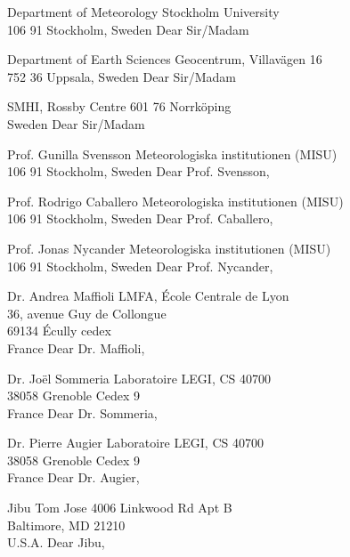 %

Department of Meteorology
Stockholm University\\106 91 Stockholm, Sweden
Dear Sir/Madam

Department of Earth Sciences
Geocentrum, Villavägen 16\\752 36 Uppsala, Sweden
Dear Sir/Madam

SMHI, Rossby Centre
601 76 Norrköping\\Sweden
Dear Sir/Madam

Prof. Gunilla Svensson
Meteorologiska institutionen (MISU)\\106 91 Stockholm, Sweden
Dear Prof. Svensson,

Prof. Rodrigo Caballero
Meteorologiska institutionen (MISU)\\106 91 Stockholm, Sweden
Dear Prof. Caballero,

Prof. Jonas Nycander
Meteorologiska institutionen (MISU)\\106 91 Stockholm, Sweden
Dear Prof. Nycander,

%

Dr. Andrea Maffioli
LMFA, École Centrale de Lyon\\36, avenue Guy de Collongue\\69134 Écully cedex\\France
Dear Dr. Maffioli,

Dr. Jo\"el Sommeria
Laboratoire LEGI, CS 40700\\38058 Grenoble Cedex 9\\France
Dear Dr. Sommeria,

Dr. Pierre Augier
Laboratoire LEGI, CS 40700\\38058 Grenoble Cedex 9\\France
Dear Dr. Augier,

%

Jibu Tom Jose
4006 Linkwood Rd Apt B\\Baltimore, MD 21210\\U.S.A.
Dear Jibu,

